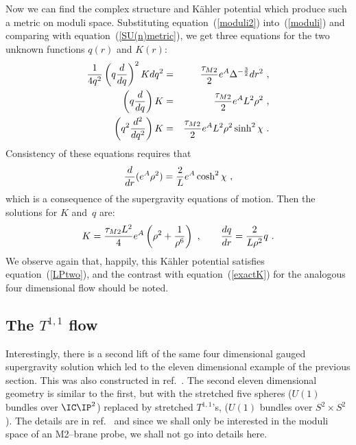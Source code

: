 \documentclass[a4paper,12pt]{article}
\newcommand{\labell}[1]{\label{#1}}
\newcommand{\reef}[1]{(\ref{#1})}
\begin{document}
Now we can find the complex structure and K\"ahler potential which
produce such a metric on moduli space.  Substituting
equation~(\ref{moduli2}) into~(\ref{moduli}) and comparing with
equation~(\ref{SU(n)metric}), we get three equations for the two
unknown functions $q(r)$ and $K(r)$:
\begin{eqnarray}
 {1 \over 4q^2} \left(q {d \over dq}\right)^2 K  dq^2 &=& {\tau_{M2} \over 2}
 e^A \Delta^{-{3 \over 2}} dr^2\ ,
  \labell{M2eqn-a} \\
 \left(q {d \over dq}\right) K &=& {\tau_{M2} \over 2} e^A L^2 \rho^2\ ,
  \labell{M2eqn-b} \\
 \left(q^2 {d^2 \over dq^2}\right) 
K &=& {\tau_{M2} \over 2} e^A L^2 \rho^2 \sinh^2 \chi\ .
 \labell{M2eqn-c}
\end{eqnarray}
Consistency of these equations requires that
\begin{equation}
{d \over dr} (e^A \rho^2) = {2 \over L} e^A \cosh^2 \chi\ ,
\end{equation}
which is a consequence of the supergravity equations of motion. Then
the solutions for $K$ and~$q$ are:
\begin{equation}
K = {\tau_{M2} L^2 \over 4} e^A \left(\rho^{2}+\frac{1}{\rho^6}  \right)\ , \qquad
{dq \over dr} = {2 \over L \rho^2} q\ .
  \labell{KM2}
\end{equation}
We observe again that, happily, this K\"ahler potential satisfies
equation~\reef{LPtwo}, and the contrast with equation~\reef{exactK}
for the analogous four dimensional flow should be noted.

\subsection{The $T^{1,1}$ flow}
\label{connie}
Interestingly, there is a second lift of the same four dimensional
gauged supergravity solution which led to the eleven dimensional
example of the previous section. This was also constructed in
ref.~\cite{newwarner}. The second eleven dimensional geometry is
similar to the first, but with the stretched five spheres ($U(1)$
bundles over $\IC\IP^2$) replaced by stretched $T^{1,1}$'s, ($U(1)$
bundles over $S^2\times S^2$). The details are in
ref.~\cite{newwarner} and since we shall only be interested in the
moduli space of an M2--brane probe, we shall not go into details here.
\end{document}
